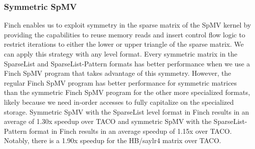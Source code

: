 \subsubsection{Symmetric SpMV}
Finch enables us to exploit symmetry in the sparse matrix of the SpMV kernel by providing the capabilities to reuse memory reads and insert control flow logic to restrict iterations to either the lower or upper triangle of the sparse matrix. We can apply this strategy with any level format. Every symmetric matrix in the SparseList and SparseList-Pattern formats has better performance when we use a Finch SpMV program that takes advantage of this symmetry. However, the regular Finch SpMV program has better performance for symmetric matrices than the symmetric Finch SpMV program for the other more specialized formats, likely because we need in-order accesses to fully capitalize on the specialized storage. Symmetric SpMV with the SparseList level format in Finch results in an average of 1.30x speedup over TACO and symmetric SpMV with the SparseList-Pattern format in Finch results in an average speedup of 1.15x over TACO. Notably, there is a 1.90x speedup for the HB/saylr4 matrix over TACO. 



